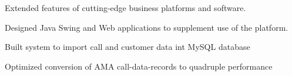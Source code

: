 \documentclass[letterpaper]{deedy-resume} %
\begin{document}
\begin{minipage}[t]{0.66\textwidth}
\vspace{\topsep} %
\begin{tightitemize}
\item Extended features of cutting-edge business platforms and software.
\item Designed Java Swing and Web applications to supplement use of the platform.
\item Built system to import call and customer data int MySQL database
\item Optimized conversion of AMA call-data-records to quadruple performance
\end{tightitemize}

\sectionspace %



\end{minipage} %








\end{document}
